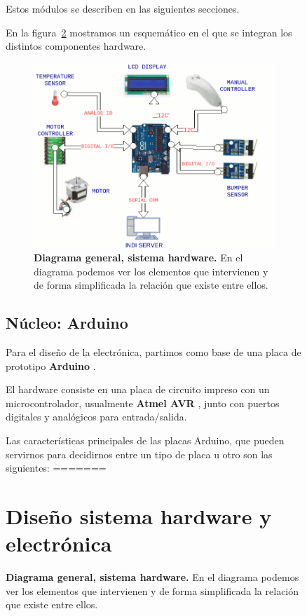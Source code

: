 \begin{figure}[h]
Estos módulos se describen en las siguientes secciones.

En la figura~\ref{fig:diagramaHardware} mostramos un esquemático en el que se integran los distintos componentes hardware.

\begin{figure}[h]
	\centering
	\includegraphics[width=1\linewidth]{../images/diagramaHardware}
	\caption[Diagrama general, sistema hardware]{\textbf{Diagrama general, sistema hardware.} En el diagrama podemos ver los elementos que intervienen y de forma simplificada la relación que existe entre ellos.}
	\label{fig:diagramaHardware}
\end{figure}



\subsection{Núcleo: Arduino}
Para el diseño de la electrónica, partimos como base de una placa de prototipo \textbf{Arduino} \cite{ARDUINO}.

El hardware consiste en una placa de circuito impreso con un microcontrolador, usualmente \textbf{Atmel AVR} \cite{Atmel}, junto con  puertos digitales y analógicos para entrada/salida.

Las características principales de las placas Arduino, que pueden servirnos para decidirnos entre un tipo de placa u otro son las siguientes:
=======
\section{Diseño sistema hardware y electrónica}


\end{figure}

